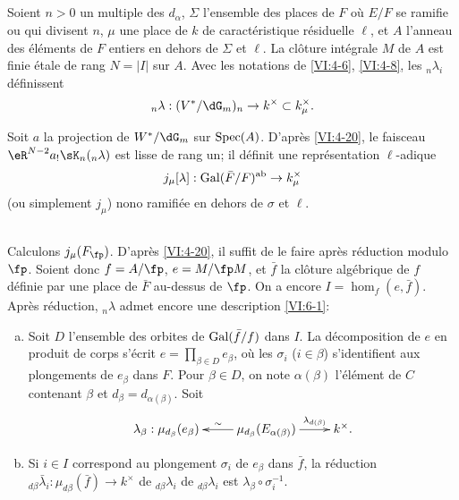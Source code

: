 \subsection{}\label{VI:6-2}

Soient $n>0$ un multiple des $d_\alpha$, $\Sigma$ l'ensemble des places de $F$ 
o\`u $E/F$ se ramifie ou qui divisent $n$, $\mu$ une place de $k$ de 
caract\'eristique r\'esiduelle $\ell$, et $A$ l'anneau des \'el\'ements de $F$ 
entiers en dehors de $\Sigma$ et $\ell$. La cl\^oture int\'egrale $M$ de $A$ 
est finie \'etale de rang $N=|I|$ sur $A$. Avec les notations de \ref{VI:4-6}, 
\ref{VI:4-8}, les $_n \lambda_i$ d\'efinissent 
\[
  _n\lambda:(V^\ast/\dG_m)_n \to k^\times \subset k_\mu^\times \text{.} 
\]

Soit $a$ la projection de $W^\ast/\dG_m$ sur $\operatorname{Spec}(A)$. D'apr\`es 
\ref{VI:4-20}, le faisceau $\eR^{N-2} a_! \sK_n(_n \lambda)$ est lisse de rang 
un; il d\'efinit une repr\'esentation $\ell$-adique 
\[
  j_\mu[\lambda]:\operatorname{Gal}(\bar F/F)^\text{ab} \to k_\mu^\times 
\]
(ou simplement $j_\mu$) nono ramifi\'ee en dehors de $\sigma$ et $\ell$. 





\subsection{}\label{VI:6-3}

Calculons $j_\mu(F_\fp)$. D'apr\`es \ref{VI:4-20}, il suffit de le faire 
apr\`es r\'eduction modulo $\fp$. Soient donc $f=A/\fp$, $e=M/\fp  M$, et 
$\bar f$ la cl\^oture alg\'ebrique de $f$ d\'efinie par une place de $\bar F$ 
au-dessus de $\fp$. On a encore $I=\hom_f(e,\bar f)$. Apr\`es r\'eduction, 
$_n\lambda$ admet encore une description \ref{VI:6-1}: 
\begin{enumerate}[a)]
  \item Soit $D$ l'ensemble des orbites de $\operatorname{Gal}(\bar f/f)$ dans $I$. La 
    d\'ecomposition de $e$ en produit de corps s'\'ecrit 
    $e=\prod_{\beta\in D} e_\beta$, o\`u les $\sigma_i$ ($i\in \beta$) 
    s'identifient aux plongements de $e_\beta$ dans $F$. Pour $\beta\in D$, on 
    note $\alpha(\beta)$ l'\'el\'ement de $C$ contenant $\beta$ et 
    $d_\beta=d_{\alpha(\beta)}$. Soit 
    \[\xymatrix{
      \lambda_\beta : \mu_{d_\beta}(e_\beta) 
        & \ar[l]_-\sim \mu_{d_\beta}(E_{\alpha(\beta)}) \ar[r]^-{\lambda_{d(\beta)}} 
        & k^\times \text{.} 
    }\]
  \item Si $i\in I$ correspond au plongement $\sigma_i$ de $e_\beta$ dans 
    $\bar f$, la r\'eduction 
    $_{d\beta} \bar\lambda_i:\mu_{d\beta}(\bar f) \to k^\times$ de 
    $_{d\beta} \lambda_i$ de $_{d\beta} \lambda_i$ est 
    $\lambda_\beta \circ \sigma_i^{-1}$. 
\end{enumerate}

